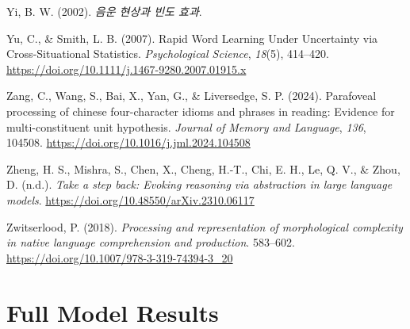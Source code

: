 \documentclass[
  12pt,
  letterpaper,
]{scrreprt}
\newlength{\cslhangindent}
\newenvironment{CSLReferences}[2] %
 {\begin{list}{}{%
  \setlength{\itemindent}{0pt}
  \setlength{\leftmargin}{0pt}
  \setlength{\parsep}{0pt}
  \ifodd #1
   \setlength{\leftmargin}{\cslhangindent}
   \setlength{\itemindent}{-1\cslhangindent}
  \fi
  \setlength{\itemsep}{#2\baselineskip}}}
 {\end{list}}
\begin{document}
\begin{CSLReferences}{1}{0}
Yi, B. W. (2002). \emph{음운 현상과 빈도 효과}.

Yu, C., \& Smith, L. B. (2007). Rapid Word Learning Under Uncertainty
via Cross-Situational Statistics. \emph{Psychological Science},
\emph{18}(5), 414--420.
\url{https://doi.org/10.1111/j.1467-9280.2007.01915.x}

Zang, C., Wang, S., Bai, X., Yan, G., \& Liversedge, S. P. (2024).
Parafoveal processing of chinese four-character idioms and phrases in
reading: Evidence for multi-constituent unit hypothesis. \emph{Journal
of Memory and Language}, \emph{136}, 104508.
\url{https://doi.org/10.1016/j.jml.2024.104508}

Zheng, H. S., Mishra, S., Chen, X., Cheng, H.-T., Chi, E. H., Le, Q. V.,
\& Zhou, D. (n.d.). \emph{Take a step back: Evoking reasoning via
abstraction in large language models}.
\url{https://doi.org/10.48550/arXiv.2310.06117}

Zwitserlood, P. (2018). \emph{Processing and representation of
morphological complexity in native language comprehension and
production}. 583--602.
\url{https://doi.org/10.1007/978-3-319-74394-3_20}

\end{CSLReferences}

\endgroup

\cleardoublepage
{}
{}
\appendix

\chapter{Full Model Results}\label{sec-full-model-results}
\end{document}

